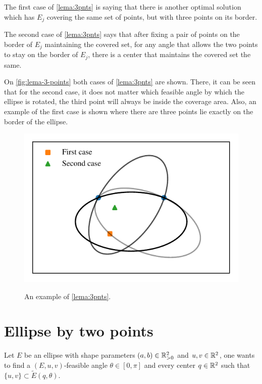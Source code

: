 The first case of \autoref{lema:3pnts} is saying that there is another optimal solution which has $E_j$ covering the same set of points, but with three points on its border. 

The second case of \autoref{lema:3pnts} says that after fixing a pair of points on the border of $E_j$ maintaining the covered set, for any angle that allows the two points to stay on the border of $E_j$, there is a center that maintains the covered set the same.

On \autoref{fig:lema-3-points} both cases of \autoref{lema:3pnts} are shown. There, it can be seen that for the second case, it does not matter which feasible angle by which the ellipse is rotated, the third point will always be inside the coverage area. Also, an example of the first case is shown where there are three points lie exactly on the border of the ellipse.

\begin{figure}[H]
	\centering
	\caption{An example of \autoref{lema:3pnts}.}
	\includegraphics[scale=.8]{tex/figures/scripts/lema-3-points}
	\fautor
	\label{fig:lema-3-points}
\end{figure}


\section{Ellipse by two points}

Let $E$ be an ellipse with shape parameters $(a, b)\in \mathbb{R}^2_{>0}$ and $u, v\in \mathbb{R}^2$, one wants to find a $(E, u, v)$-feasible angle $\theta\in[0,\pi]$ and every center $q\in\mathbb{R}^2$ such that $\{u, v\} \subset \tilde{E}(q, \theta)$.

